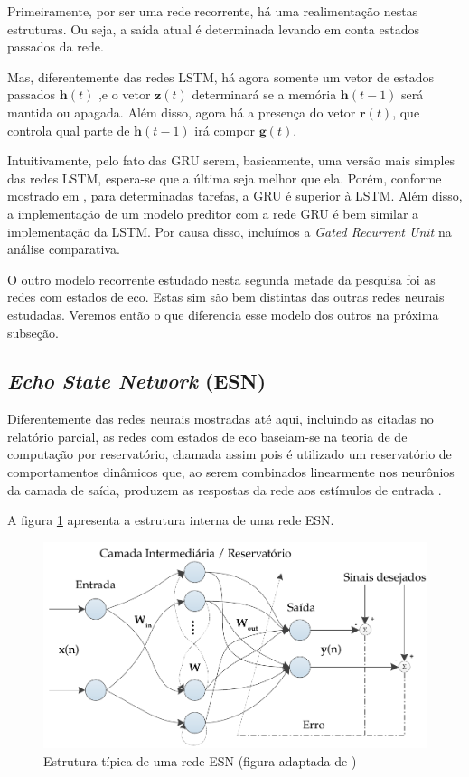 \documentclass[a4paper, 12pt]{article}
\begin{document}
Primeiramente, por ser uma rede recorrente, há uma realimentação nestas estruturas. Ou seja, a saída atual é determinada levando em conta estados passados da rede.

Mas, diferentemente das redes LSTM, há agora somente um vetor de estados passados $\mathbf{h}(t)$ ,e o vetor $\mathbf{z}(t)$ determinará se a memória $\mathbf{h}(t-1)$ será mantida ou apagada. Além disso, agora há a presença do vetor $\mathbf{r}(t)$, que controla qual parte de $\mathbf{h}(t-1)$ irá compor $\mathbf{g}(t)$. 

Intuitivamente, pelo fato das GRU serem, basicamente, uma versão mais simples das redes LSTM, espera-se que a última seja melhor que ela. Porém, conforme mostrado em \cite{cho2014learning}, para determinadas tarefas, a GRU é superior à LSTM. Além disso, a implementação de um modelo preditor com a rede GRU é bem similar a implementação da LSTM. Por causa disso, incluímos a \textit{Gated Recurrent Unit} na análise comparativa. 

O outro modelo recorrente estudado nesta segunda metade da pesquisa foi as redes com estados de eco. Estas sim são bem distintas das outras redes neurais estudadas. Veremos então o que diferencia esse modelo dos outros na próxima subseção.

\subsection{\textit{Echo State Network} (ESN)}

Diferentemente das redes neurais mostradas até aqui, incluindo as citadas no relatório parcial, as redes com estados de eco baseiam-se na teoria de de computação por reservatório, chamada assim pois é utilizado um reservatório de comportamentos dinâmicos que, ao serem combinados linearmente nos neurônios da camada de saída, produzem as respostas da rede aos estímulos de entrada \cite{boccato2013novas}. 

A figura \ref{fig:esn-model} apresenta a estrutura interna de uma rede ESN.
\begin{figure}[H]
\centering
\includegraphics[scale = 0.8]{esn-network.pdf}
\caption{Estrutura típica de uma rede ESN (figura adaptada de \cite{boccato2013novas}) }
\label{fig:esn-model}
\end{figure}
\end{document}

